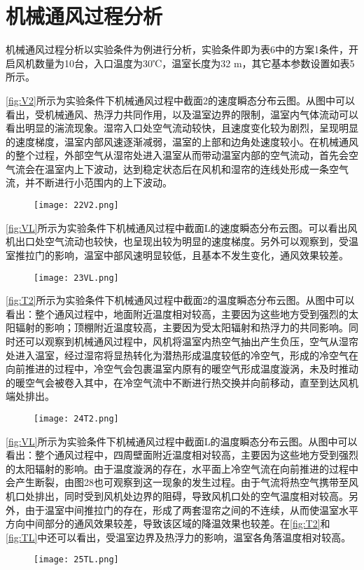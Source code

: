 \section{机械通风过程分析}
机械通风过程分析以实验条件为例进行分析，实验条件即为表6中的方案1条件，开启风机数量为10台，入口温度为30℃，温室长度为32 m，其它基本参数设置如表5所示。

\ref{fig:V2}所示为实验条件下机械通风过程中截面2的速度瞬态分布云图。从图中可以看出，受机械通风、热浮力共同作用，以及温室边界的限制，温室内气体流动可以看出明显的湍流现象。湿帘入口处空气流动较快，且速度变化较为剧烈，呈现明显的速度梯度，温室内部风速逐渐减弱，温室的上部和边角处速度较小。在机械通风的整个过程，外部空气从湿帘处进入温室从而带动温室内部的空气流动，首先会空气流会在温室内上下波动，达到稳定状态后在风机和湿帘的连线处形成一条空气流，并不断进行小范围内的上下波动。
	\begin{figure}[!htp]
		\centering
		\texttt{[image: 22V2.png]}
	\end{figure}
\ref{fig:VL}所示为实验条件下机械通风过程中截面L的速度瞬态分布云图。可以看出风机出口处空气流动也较快，也呈现出较为明显的速度梯度。另外可以观察到，受温室推拉门的影响，温室中部风速明显较低，且基本不发生变化，通风效果较差。
	\begin{figure}[!htp]
		\centering
		\texttt{[image: 23VL.png]}
	\end{figure}
\ref{fig:T2}所示为实验条件下机械通风过程中截面2的温度瞬态分布云图。从图中可以看出：整个通风过程中，地面附近温度相对较高，主要因为这些地方受到强烈的太阳辐射的影响；顶棚附近温度较高，主要因为受太阳辐射和热浮力的共同影响。同时还可以观察到机械通风过程中，风机将温室内热空气抽出产生负压，空气从湿帘处进入温室，经过湿帘将显热转化为潜热形成温度较低的冷空气，形成的冷空气在向前推进的过程中，冷空气会包裹温室内原有的暖空气形成温度漩涡，未及时推动的暖空气会被卷入其中，在冷空气流中不断进行热交换并向前移动，直至到达风机端处排出。
	\begin{figure}[!htp]
		\centering
		\texttt{[image: 24T2.png]}
	\end{figure}
\ref{fig:VL}所示为实验条件下机械通风过程中截面L的温度瞬态分布云图。从图中可以看出：整个通风过程中，四周壁面附近温度相对较高，主要因为这些地方受到强烈的太阳辐射的影响。由于温度漩涡的存在，水平面上冷空气流在向前推进的过程中会产生断裂，由图28也可观察到这一现象的发生过程。由于气流将热空气携带至风机口处排出，同时受到风机处边界的阻碍，导致风机口处的空气温度相对较高。另外，由于温室中间推拉门的存在，形成了两套湿帘之间的不连续，从而使温室水平方向中间部分的通风效果较差，导致该区域的降温效果也较差。在\ref{fig:T2}和\ref{fig:TL}中还可以看出，受温室边界及热浮力的影响，温室各角落温度相对较高。
	\begin{figure}[!htp]
		\centering
		\texttt{[image: 25TL.png]}
	\end{figure}
